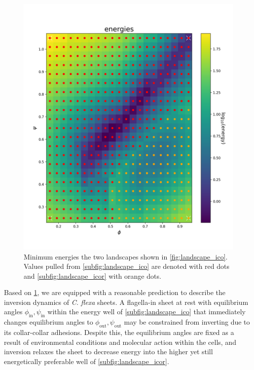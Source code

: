 \begin{figure}[ptbh]
	\centering
	\includegraphics[height=\textheight]{landscape_merge.png}
	\caption[Combined energy landscape]{Minimum energies the two landscapes shown in \cref{fig:landscape_ico}. Values pulled from \cref{subfig:landscape_ico} are denoted with red dots and \cref{subfig:landscape_icor} with orange dots.}
	\label{fig:landscape_merge}
\end{figure}

Based on \cref{fig:landscape_merge}, we are equipped with a reasonable prediction to describe the inversion dynamics of \textit{C. flexa} sheets.
A flagella-in sheet at rest with equilibrium angles $\phi_{\text{in}}, \psi_{\text{in}}$ within the energy well of \cref{subfig:landscape_ico} that immediately changes equilibrium angles to $\phi_{\text{out}}, \psi_{\text{out}}$ may be constrained from inverting due to its collar-collar adhesions.
Despite this, the equilibrium angles are fixed as a result of environmental conditions and molecular action within the cells, and inversion relaxes the sheet to decrease energy into the higher yet still energetically preferable well of \cref{subfig:landscape_icor}. 

